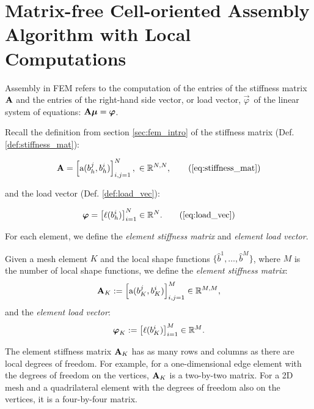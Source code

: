 \section{Matrix-free Cell-oriented Assembly Algorithm with Local Computations}

\label{sec:assembly}

Assembly in FEM refers to the computation of the entries of
the stiffness matrix $\mathbf{A}$ and the entries of the right-hand side vector, or load vector, $\vec{\varphi}$\
of the linear system of equations: $\mathbf{A}\boldsymbol{\mu} = \boldsymbol{\varphi}$.

Recall the definition from section \ref{sec:fem_intro} of the stiffness matrix
(Def. \ref{def:stiffness_mat}):

\begin{align}
    \mat{A} = \left[ \mathrm{a}(b_h^j, b_h^i) \right]^N_{i,j=1}, \ \in \R^{N,N},
    \tag{\ref{eq:stiffness_mat}}
\end{align}

and the load vector (Def. \ref{def:load_vec}):

\begin{align}
    \vec{\varphi} = \left[ \ell(b_h^i) \right]^N_{i=1} \in \R^{N}. \tag{\ref{eq:load_vec}}
\end{align}

For each element, we define the \emph{element stiffness matrix} and \emph{element load vector}.

\begin{definition}
    Given a mesh element $K$ and the local shape functions $\{\hat{b}^1, \dots, \hat{b}^M \}$,
    where $M$ is the number of local shape functions, we define the \emph{element stiffness matrix}:
    \begin{align}
        \mathbf{A}_K := \left[ \mathrm{a}(b_K^j, b_K^i) \right]_{i,j=1}^M \in \mathbb{R}^{M,M},
    \end{align}
    and the \emph{element load vector}:
    \begin{align}
        \boldsymbol{\varphi}_K := \left[ \ell(b_K^i) \right]_{i=1}^M \in \mathbb{R}^M.
    \end{align}
\end{definition}

The element stiffness matrix $\mathbf{A}_K$ has as many rows and columns as there are local degrees of freedom.
For example, for a one-dimensional edge element with the degrees of freedom on the vertices, $\mathbf{A}_K$ is a
two-by-two matrix. For a 2D mesh and a quadrilateral element with the degrees of freedom also on the vertices,
it is a four-by-four matrix.

